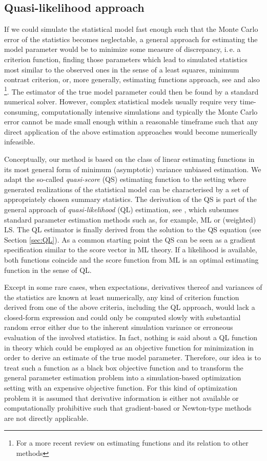 \subsection{Quasi-likelihood approach}
If we could simulate the statistical model fast enough such that the Monte Carlo
error of the statistics becomes neglectable, a general approach for estimating
the model parameter would be to minimize some measure of discrepancy, i.\,e.
a criterion function, finding those parameters which lead to simulated
statistics most similar to the observed ones in the sense of a least squares, minimum contrast criterion,
or, more generally, estimating functions approach, see \citet{Godambe1991} and
also \cite{Jesus871}\footnote{For a more recent review on estimating functions
and its relation to other methods}.
The estimator of the true model parameter could then be found by a standard
numerical solver. However, complex statistical models usually require very
time-consuming, computationally intensive simulations and typically the Monte Carlo error cannot
be made small enough within a reasonable timeframe such that any direct
application of the above estimation approaches would become numerically infeasible.\par
%
Conceptually, our method is based on the class of linear estimating functions in
its most general form of minimum (asymptotic) variance unbiased estimation. We adapt the so-called
\emph{quasi-score} (QS) estimating function to the setting where generated
realizations of the statistical model can be characterised by a set of appropriately chosen summary
statistics. The derivation of the QS is part of the general approach of
\emph{quasi-likelihood} (QL) estimation, see \citet{ref:Heyde1997}, which subsumes standard parameter
estimation methods such as, for example, ML or (weighted) LS. The QL estimator
is finally derived from the solution to the QS equation (see Section \ref{sec:QL}).
As a common starting point the QS can be seen as a gradient specification
similar to the score vector in ML theory. If a likelihood is available, both
functions coincide and the score function from ML is an optimal estimating
function in the sense of QL.\par
%
Except in some rare cases, when expectations, derivatives thereof and variances
of the statistics are known at least numerically, any kind of criterion function derived from one
of the above criteria, including the QL approach, would lack a closed-form
expression and could only be computed slowly with substantial random error either due to the inherent
simulation variance or erroneous evaluation of the involved statistics. In fact,
nothing is said about a QL function in theory which could be employed as an
objective function for minimization in order to derive an estimate of the true
model parameter. Therefore, our idea is to treat such a function as a black box
objective function and to transform the general parameter estimation problem into a simulation-based
optimization setting with an expensive objective function. For this kind of
optimization problem it is assumed that derivative information is either not available or
computationally prohibitive such that gradient-based or Newton-type methods are not directly applicable.\par
%
